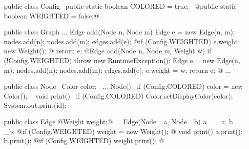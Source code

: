 \begin{frame}[fragile]{\myframetitle}
	\begin{mycolumns}
\begin{tiny}
\begin{codetight}{}
public class Config {
	~public static boolean COLORED = true;~
	@public static boolean WEIGHTED = false;@
}
\end{codetight}
\begin{codetight}{}
public class Graph {
	...
	Edge add(Node n, Node m) {
		Edge e = new Edge(n, m);
		nodes.add(n); nodes.add(m); edges.add(e);
		@if (Config.WEIGHTED) { e.weight = new Weight(); }@
		return e;
	}
	@Edge add(Node n, Node m, Weight w) {
		if (!Config.WEIGHTED) { throw new RuntimeException(); }
		Edge e = new Edge(n, m);
		nodes.add(n); nodes.add(m); edges.add(e);
		e.weight = w;
		return e;
	}@
	...
}
\end{codetight}
\end{tiny}	
		\mynextcolumn
\begin{tiny}
\begin{codetight}{}
public class Node {
	~Color color;~
	...
	Node(){
		~if (Config.COLORED) { color = new Color(); }~
	}
	void print() {
		~if (Config.COLORED) { Color.setDisplayColor(color); }~
		System.out.print(id);
	}
}
\end{codetight}
\begin{codetight}{}
public class Edge {
	@Weight weight;@
	...
	Edge(Node _a, Node _b) {
		a = _a; b = _b;
		@if (Config.WEIGHTED) { weight = new Weight(); }@
	}
	void print() {
		a.print(); b.print();
		@if (Config.WEIGHTED) { weight.print(); }@
	}
}
\end{codetight}
\end{tiny}	
	\end{mycolumns}
\end{frame}


